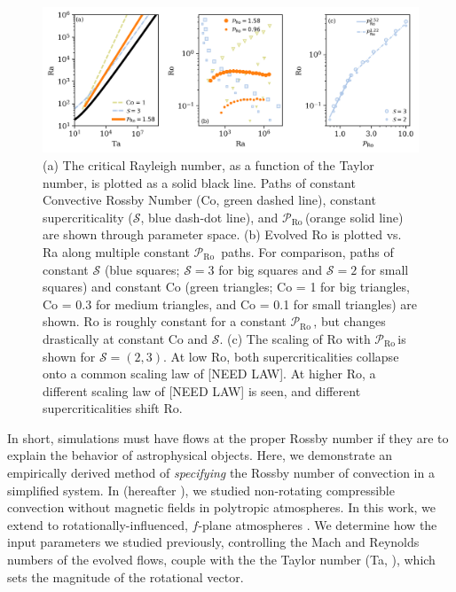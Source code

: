 \documentclass[twocolumn, amsmath, amsfonts, amssymb]{aastex62}
\newcommand{\pro}{\ensuremath{\mathcal{P}_{\text{Ro}}\,}}
\begin{document}
\begin{figure}[t!]
    \includegraphics[width=\textwidth]{parameter_space.png}
    \caption{(a) The critical Rayleigh number, as a function of the Taylor number, 
    is plotted as a solid black line. Paths of constant Convective Rossby Number
    (Co, green dashed line), constant supercriticality ($\mathcal{S}$, blue dash-dot line), and 
    \pro (orange solid line) are shown through parameter space. (b) Evolved
    Ro is plotted vs. Ra along multiple constant \pro
    paths. For comparison, paths of constant $\mathcal{S}$ (blue squares; $\mathcal{S} = 3$ for
    big squares and $\mathcal{S} = 2$ for small squares)
    and constant Co (green triangles; Co = 1 for big triangles, Co = 0.3 for medium triangles,
    and Co = 0.1 for small triangles) are shown.
    Ro is roughly constant for a constant \pro, but changes drastically at constant Co and 
    $\mathcal{S}$.
    (c) The scaling of Ro with \pro is shown for $\mathcal{S} = (2,3)$.
    At low Ro, both supercriticalities collapse onto a common scaling law of [NEED LAW].
    At higher Ro, a different scaling law of [NEED LAW] is seen, and different supercriticalities
    shift Ro.
    \label{fig:parameter_space} }
\end{figure}


In short, simulations must have flows
at the proper Rossby number if they are to  explain the behavior of
astrophysical objects.
Here, we demonstrate an empirically derived method of \emph{specifying} the Rossby number
of convection in a simplified system.
In \cite{anders&brown2017} (hereafter \AB), we studied non-rotating
compressible convection without magnetic fields in polytropic atmospheres. 
In this work, we extend \AB to rotationally-influenced, $f$-plane
atmospheres 
\cite[e.g.][]{brummell&all1996, brummell&all1998, calkins&all2015a}. We determine
how the input parameters we studied previously, controlling the Mach and
Reynolds numbers of the evolved flows, couple with the the Taylor number (Ta, \cite{julien&all1996}), which sets the magnitude of the rotational vector. 
\end{document}
